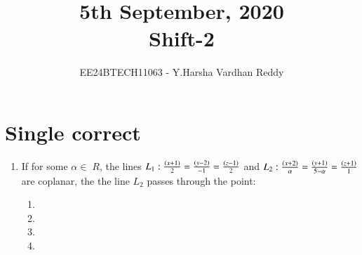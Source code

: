 \documentclass[journal,,12pt,onecolumn]{IEEEtran}
\theoremstyle{remark}
\begin{document}

\vspace{3cm}

\title{5th September, 2020\\Shift-2}
\author{EE24BTECH11063 - Y.Harsha Vardhan Reddy}
\maketitle

\bigskip

\renewcommand{\thefigure}{\theenumi}
\renewcommand{\thetable}{\theenumi}

\section*{Single correct}
\begin{enumerate}
    \item If for some $\alpha\in\;R$, the lines $L_1 : \frac{\left(x+1\right)}{2}=\frac{\left(y-2\right)}{-1}=\frac{\left(z-1\right)}{2}$ and $L_2 : \frac{\left(x+2\right)}{\alpha}=\frac{\left(y+1\right)}{5-\alpha}=\frac{\left(z+1\right)}{1}$ are coplanar, the the line $L_2$ passes through the point:
    \begin{enumerate}
    
        
    
        \item {}
        \item {}
        \item {}
        \item {}
        

\end{enumerate}
\end{enumerate}
\end{document}
